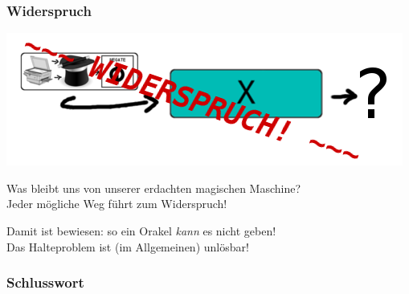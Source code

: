 \documentclass[aspectratio=43]{beamer}
\begin{document}
\begin{frame}
\frametitle{Widerspruch}
\begin{center}
\includegraphics[scale=1.4]{images/input_contradiction.png} 
\bigskip

Was bleibt uns von unserer erdachten magischen Maschine?\\
Jeder mögliche Weg führt zum Widerspruch!
\bigskip

Damit ist bewiesen: so ein Orakel \emph{kann} es nicht geben!\\
Das Halteproblem ist (im Allgemeinen) unlösbar!
\end{center}
\end{frame}


\begin{frame}
\frametitle{Schlusswort}

\end{frame}
\end{document}
